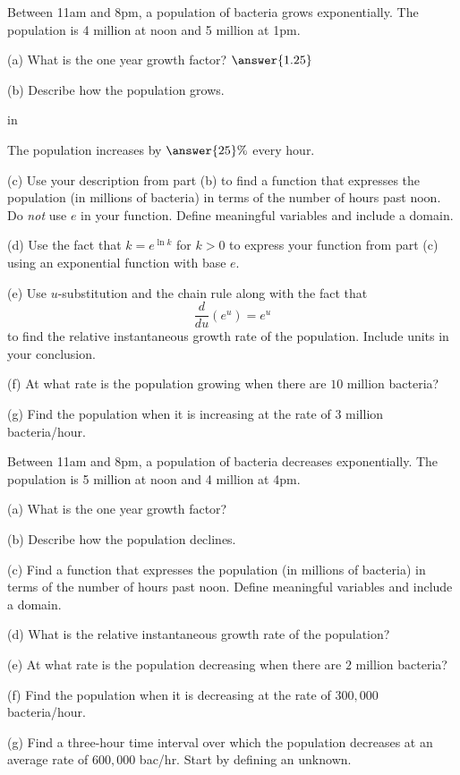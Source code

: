 \documentclass{ximera}
\newcommand{\pskip}{\vskip 0.1 in}
\begin{document}
\begin{question}  \label{Qe545tgbvb}
Between 11am and 8pm, a population of bacteria grows exponentially. The population is 4 million at noon and 5 million at 1pm.

(a) What is the one year growth factor?  $\answer{1.25}$

(b) Describe how the population grows. 

\pskip

The population increases by $\answer{25}\%$ every hour.

(c) Use your description from part (b) to find a function that expresses the population (in millions of bacteria) in terms of the number of hours past noon. Do \emph{not} use $e$ in your function. Define meaningful variables and include a domain.

(d) Use the fact that $k = e^{\ln k}$ for $k>0$ to express your function from part (c) using an exponential function with base $e$.

(e) Use $u$-substitution and the chain rule along with the fact that 
\[
     \frac{d}{du}(e^{u}) = e^{u}
\]
to find the relative instantaneous growth rate of the population. Include units in your conclusion.

(f) At what rate is the population growing when there are $10$ million bacteria?

(g) Find the population when it is increasing at the rate of $3$ million bacteria/hour.

\end{question}


\begin{question}  \label{Q234gt44}
Between 11am and 8pm, a population of bacteria decreases exponentially. The population is 5 million at noon and 4 million at 4pm.

(a) What is the one year growth factor?

(b) Describe how the population declines.

(c) Find a function that expresses the population (in millions of bacteria) in terms of the number of hours past noon. Define meaningful variables and include a domain.

(d) What is the relative instantaneous growth rate of the population?

(e) At what rate is the population decreasing when there are $2$ million bacteria?

(f) Find the population when it is decreasing at the rate of $300,000$ bacteria/hour.

(g) Find a three-hour time interval over which the population decreases at an average rate of $600,000$ bac/hr. Start by defining an unknown.

\end{question}
\end{document}
